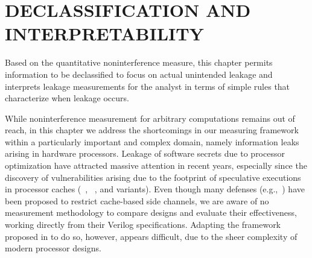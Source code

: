 \chapter{\uppercase{Declassification and Interpretability}}
\label{chap:dinome}
\graphicspath{{./}{./fig/}{./fig/dinome/}{./fig/dinome/normalcache/}{./fig/dinome/scatter/}{./fig/dinome/phantom/}{./fig/dinome/time/}}
Based on the quantitative noninterference measure, this chapter permits
information to be declassified to focus on actual unintended leakage
and interprets leakage measurements for the analyst in terms of simple
rules that characterize when leakage occurs.

While noninterference measurement for arbitrary computations remains
out of reach, in this chapter we address the shortcomings in our
measuring framework within a particularly important and complex
domain, namely information leaks arising in hardware processors.
Leakage of software secrets due to processor optimization have
attracted massive attention in recent years, especially since the
discovery of vulnerabilities arising due to the footprint of
speculative executions in processor caches (\spectre~\cite{spectre},
\meltdown~\cite{meltdown}, and variants).  Even though many defenses
(e.g.,~\cite{wang2007new,cachebar,scatterCache,phantomCache}) have
been proposed to restrict cache-based side channels, we are
aware of no measurement methodology to compare designs and evaluate
their effectiveness, working directly from their Verilog
specifications.  Adapting the framework proposed in
 to do so, however, appears difficult, due to the
sheer complexity of modern processor designs.

